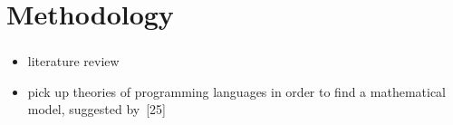 \documentclass[xcolor=svgnames]{beamer}
\begin{document}
\section{Methodology}
\begin{frame}[t]
\frametitle{}
\begin{itemize}
\item<2-> literature review

\item<3-> pick up theories of programming languages in order to find a mathematical model, suggested by~[25]


\end{itemize}
\end{frame}
\end{document}
